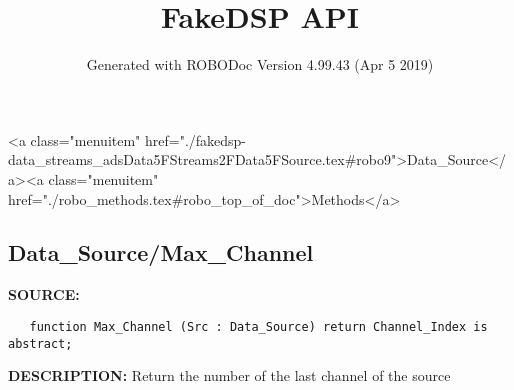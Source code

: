 \documentclass{article}
\title{FakeDSP API}
\author{Generated with ROBODoc Version 4.99.43 (Apr  5 2019)
}
\begin{document}
\maketitle
\printindex
\tableofcontents
\newpage

<a class="menuitem" href="./fakedsp-data_streams_adsData5FStreams2FData5FSource.tex#robo9">Data_Source</a><a class="menuitem" href="./robo_methods.tex#robo_top_of_doc">Methods</a>\subsection{Data\_Source/Max\_Channel}
\textbf{SOURCE:}\hspace{0.08in}\begin{verbatim}
   function Max_Channel (Src : Data_Source) return Channel_Index is abstract;
\end{verbatim}
\textbf{DESCRIPTION:}\hspace{0.08in}
   Return the number of the last channel of the source
\end{document}
